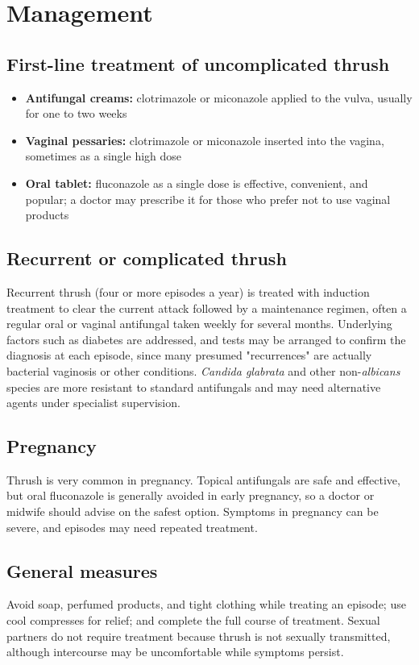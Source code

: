 \section*{Management}
\subsection*{First-line treatment of uncomplicated thrush}
\begin{itemize}
    \item \textbf{Antifungal creams:} clotrimazole or miconazole applied to the vulva, usually for one to two weeks
    \item \textbf{Vaginal pessaries:} clotrimazole or miconazole inserted into the vagina, sometimes as a single high dose
    \item \textbf{Oral tablet:} fluconazole as a single dose is effective, convenient, and popular; a doctor may prescribe it for those who prefer not to use vaginal products
\end{itemize}

\subsection*{Recurrent or complicated thrush}
Recurrent thrush (four or more episodes a year) is treated with induction treatment to clear the current attack followed by a maintenance regimen, often a regular oral or vaginal antifungal taken weekly for several months. Underlying factors such as diabetes are addressed, and tests may be arranged to confirm the diagnosis at each episode, since many presumed "recurrences" are actually bacterial vaginosis or other conditions. \textit{Candida glabrata} and other non-\textit{albicans} species are more resistant to standard antifungals and may need alternative agents under specialist supervision.

\subsection*{Pregnancy}
Thrush is very common in pregnancy. Topical antifungals are safe and effective, but oral fluconazole is generally avoided in early pregnancy, so a doctor or midwife should advise on the safest option. Symptoms in pregnancy can be severe, and episodes may need repeated treatment.

\subsection*{General measures}
Avoid soap, perfumed products, and tight clothing while treating an episode; use cool compresses for relief; and complete the full course of treatment. Sexual partners do not require treatment because thrush is not sexually transmitted, although intercourse may be uncomfortable while symptoms persist.

